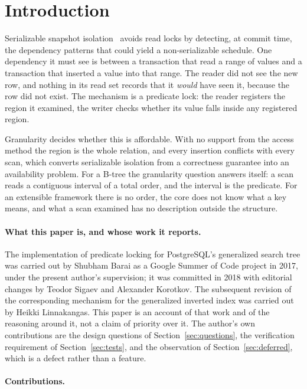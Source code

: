 \section{Introduction}

Serializable snapshot isolation~\cite{ports2012ssi} avoids read locks by
detecting, at commit time, the dependency patterns that could yield a
non-serializable schedule. One dependency it must see is between a transaction
that read a range of values and a transaction that inserted a value into that
range. The reader did not see the new row, and nothing in its read set records
that it \emph{would} have seen it, because the row did not exist. The mechanism
is a predicate lock: the reader registers the region it examined, the writer
checks whether its value falls inside any registered region.

Granularity decides whether this is affordable. With no support from the access
method the region is the whole relation, and every insertion conflicts with every
scan, which converts serializable isolation from a correctness guarantee into an
availability problem. For a B-tree the granularity question answers itself: a
scan reads a contiguous interval of a total order, and the interval is the
predicate. For an extensible framework there is no order, the core does not know
what a key means, and what a scan examined has no description outside the
structure.

\paragraph{What this paper is, and whose work it reports.} The implementation of
predicate locking for PostgreSQL's generalized search tree was carried out by
Shubham Barai as a Google Summer of Code project in 2017, under the present
author's supervision; it was committed in 2018 with editorial changes by Teodor
Sigaev and Alexander Korotkov. The subsequent revision of the corresponding
mechanism for the generalized inverted index was carried out by Heikki
Linnakangas. This paper is an account of that work and of the reasoning around
it, not a claim of priority over it. The author's own contributions are the
design questions of Section~\ref{sec:questions}, the verification requirement of
Section~\ref{sec:tests}, and the observation of Section~\ref{sec:deferred},
which is a defect rather than a feature.

\paragraph{Contributions.}

